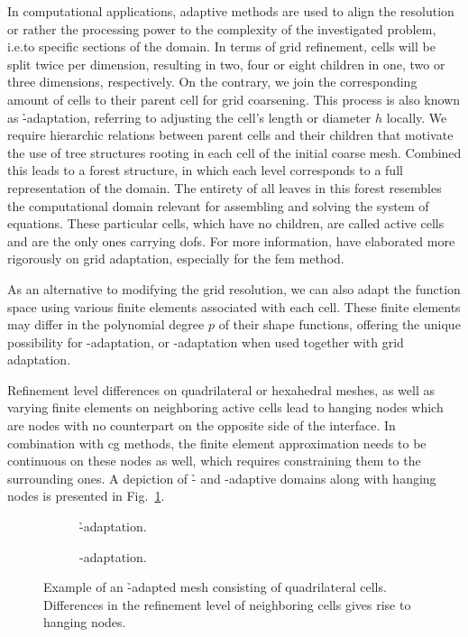 In computational applications, adaptive methods are used to align the resolution or rather the processing power to the complexity of the investigated problem, i.e.\@ to specific sections of the domain. In terms of grid refinement, cells will be split twice per dimension, resulting in two, four or eight children in one, two or three dimensions, respectively. On the contrary, we join the corresponding amount of cells to their parent cell for grid coarsening. This process is also known as \h-adaptation, referring to adjusting the cell's length or diameter \(h\) locally. We require hierarchic relations between parent cells and their children that motivate the use of tree structures rooting in each cell of the initial coarse mesh. Combined this leads to a forest structure, in which each level corresponds to a full representation of the domain. The entirety of all leaves in this forest resembles the computational domain relevant for assembling and solving the system of equations. These particular cells, which have no children, are called active cells and are the only ones carrying \glspl{dof}. For more information, \textcite{bangerth2003} have elaborated more rigorously on grid adaptation, especially for the \gls{fem} method.

As an alternative to modifying the grid resolution, we can also adapt the function space using various finite elements associated with each cell. These finite elements may differ in the polynomial degree $p$ of their shape functions, offering the unique possibility for \p-adaptation, or \hp-adaptation when used together with grid adaptation.

Refinement level differences on quadrilateral or hexahedral meshes, as well as varying finite elements on neighboring active cells lead to hanging nodes which are nodes with no counterpart on the opposite side of the interface. In combination with \gls{cg} methods, the finite element approximation needs to be continuous on these nodes as well, which requires  constraining them to the surrounding ones. A depiction of \h- and \p-adaptive domains along with hanging nodes is presented in Fig.~\ref{fig:hpadaptivity}.

\begin{figure}
\begin{subfigure}{0.49\textwidth}
  \centering
  
  \caption{\h-adaptation.}
\end{subfigure}
\begin{subfigure}{0.49\textwidth}
  \centering
  
  \caption{\p-adaptation.}
\end{subfigure}
\caption{Example of an \h-adapted mesh consisting of quadrilateral cells. Differences in the refinement level of neighboring cells gives rise to hanging nodes.}
\label{fig:hpadaptivity}
\end{figure}

